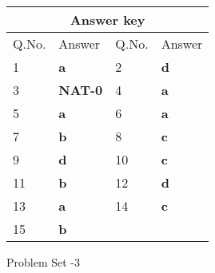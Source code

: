 \setlength\arrayrulewidth{1pt}
\begin{table}[H]
	\centering
	
	\begin{tabular}{|p{1.5cm}|p{1.5cm}||p{1.5cm}|p{1.5cm}|}
		\hline
		\multicolumn{4}{|c|}{\textbf{Answer key}}\\\hline\hline
		\rowcolor{ocrel}Q.No.&Answer&Q.No.&Answer\\\hline
		1&\textbf{a}&2&\textbf{d}\\\hline 
		3&\textbf{NAT-0}&4&\textbf{a}\\\hline
		5&\textbf{a}&6&\textbf{a}\\\hline
		7&\textbf{b}&8&\textbf{c}\\\hline
		9&\textbf{d}&10&\textbf{c}\\\hline
		11&\textbf{b}&12&\textbf{d}\\\hline
		13&\textbf{a}&14&\textbf{c}\\\hline
		15&\textbf{b}&&\\\hline
	\end{tabular}
\end{table}
\newpage
\begin{abox}
	Problem Set -3
\end{abox}
